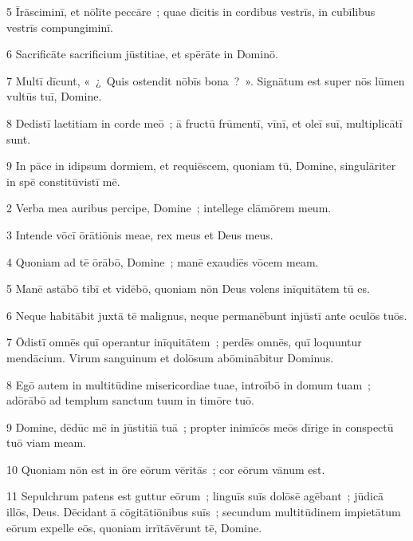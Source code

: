 \psalmVerse
  {\phantom{00}5}
  {Īrāsciminī, et nōlīte peccāre~; quae dīcitis in cordibus vestrīs, in cubīlibus vestrīs compungiminī.}


\psalmVerse
  {\phantom{00}6}
  {Sacrificāte sacrificium jūstitiae, et spērāte in Dominō.}


\psalmVerse
  {\phantom{00}7}
  {Multī dīcunt, «~¿~Quis ostendit nōbīs bona~?~». Signātum est super nōs lūmen vultūs tuī, Domine.}


\psalmVerse
  {\phantom{00}8}
  {Dedistī laetitiam in corde meō~; ā fructū frūmentī, vīnī, et oleī suī, multiplicātī sunt.}


\psalmVerse
  {\phantom{00}9}
  {In pāce in idipsum dormiem, et requiēscem, quoniam tū, Domine, singulāriter in spē constitūvistī mē.}



\psalmVerse
  {\phantom{00}2}
  {Verba mea auribus percipe, Domine~; intellege clāmōrem meum.}


\psalmVerse
  {\phantom{00}3}
  {Intende vōcī ōrātiōnis meae, rex meus et Deus meus.}


\psalmVerse
  {\phantom{00}4}
  {Quoniam ad tē ōrābō, Domine~; manē exaudiēs vōcem meam.}


\psalmVerse
  {\phantom{00}5}
  {Manē astābō tibī et vidēbō, quoniam nōn Deus volens inīquitātem tū es.}


\psalmVerse
  {\phantom{00}6}
  {Neque habitābit juxtā tē malignus, neque permanēbunt injūstī ante oculōs tuōs.}


\psalmVerse
  {\phantom{00}7}
  {Ōdistī omnēs quī operantur inīquitātem~; perdēs omnēs, quī loquuntur mendācium. Virum sanguinum et dolōsum abōminābitur Dominus.}


\psalmVerse
  {\phantom{00}8}
  {Egō autem in multitūdine misericordiae tuae, introībō in domum tuam~; adōrābō ad templum sanctum tuum in timōre tuō.}


\psalmVerse
  {\phantom{00}9}
  {Domine, dēdūc mē in jūstitiā tuā~; propter inimīcōs meōs dīrige in conspectū tuō viam meam.}


\psalmVerse
  {\phantom{0}10}
  {Quoniam nōn est in ōre eōrum vēritās~; cor eōrum vānum est.}


\psalmVerse
  {\phantom{0}11}
  {Sepulchrum patens est guttur eōrum~; linguīs suīs dolōsē agēbant~; jūdicā illōs, Deus. Dēcidant ā cōgitātiōnibus suīs~; secundum multitūdinem impietātum eōrum expelle eōs, quoniam irrītāvērunt tē, Domine.}


